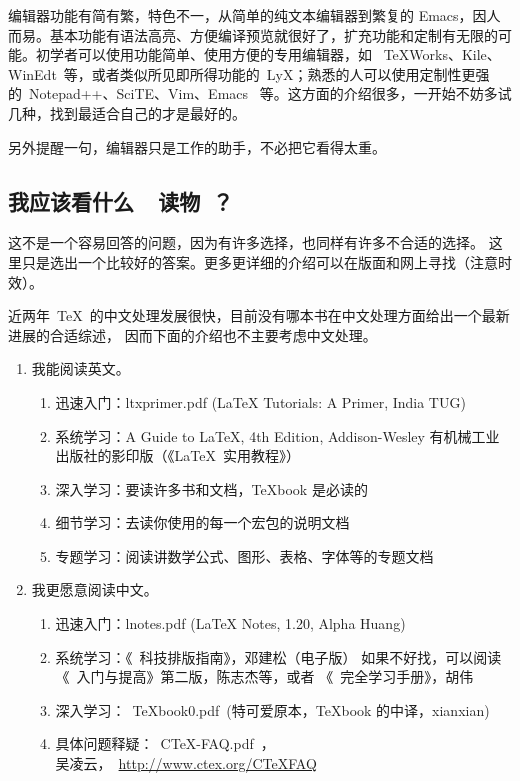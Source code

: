 编辑器功能有简有繁，特色不一，从简单的纯文本编辑器到繁复的 Emacs，因人而易。基本功能有语法高亮、方便编译预览就很好了，扩充功能和定制有无限的可能。初学者可以使用功能简单、使用方便的专用编辑器，如 ~TeXWorks、Kile、WinEdt~等，或者类似所见即所得功能的~LyX；熟悉的人可以使用定制性更强的~Notepad++、SciTE、Vim、Emacs ~等。这方面的介绍很多，一开始不妨多试几种，找到最适合自己的才是最好的。

另外提醒一句，编辑器只是工作的助手，不必把它看得太重。

\subsection{我应该看什么~\XeLaTeX~读物~？}

这不是一个容易回答的问题，因为有许多选择，也同样有许多不合适的选择。
这里只是选出一个比较好的答案。更多更详细的介绍可以在版面和网上寻找（注意时效）。

近两年~\TeX~的中文处理发展很快，目前没有哪本书在中文处理方面给出一个最新进展的合适综述，
因而下面的介绍也不主要考虑中文处理。

\begin{enumerate}

\item 我能阅读英文。
\begin{enumerate}
\item 迅速入门：ltxprimer.pdf (LaTeX Tutorials: A Primer, India TUG)
\item 系统学习：A Guide to LaTeX, 4th Edition, Addison-Wesley
               有机械工业出版社的影印版（《\LaTeX{}~实用教程》）
\item 深入学习：要读许多书和文档，TeXbook 是必读的
\item 细节学习：去读你使用的每一个宏包的说明文档
\item 专题学习：阅读讲数学公式、图形、表格、字体等的专题文档
\end{enumerate}

\item 我更愿意阅读中文。
\begin{enumerate}
\item 迅速入门：lnotes.pdf (LaTeX Notes, 1.20, Alpha Huang)
\item 系统学习：《\LaTeXe{}~科技排版指南》，邓建松（电子版）
      如果不好找，可以阅读《\LaTeXe~入门与提高》第二版，陈志杰等，或者 《\LaTeXe~完全学习手册》，胡伟
\item 深入学习：~TeXbook0.pdf~(特可爱原本，TeXbook 的中译，xianxian)
\item 具体问题释疑：~CTeX-FAQ.pdf~，\\
        吴凌云，~\url{http://www.ctex.org/CTeXFAQ}~
\end{enumerate}
\end{enumerate}

